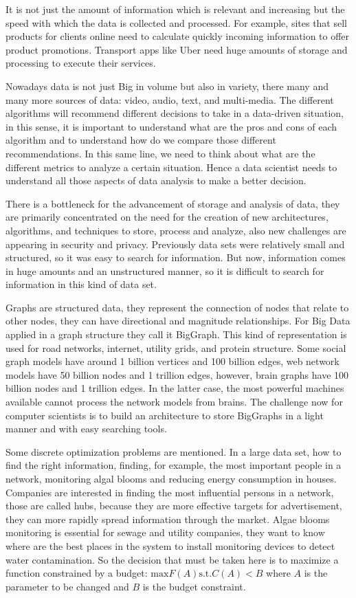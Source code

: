\documentclass[9pt,a4paper]{article}
\begin{document}
It is not just the amount of information which is relevant and increasing but the speed with which the data is collected and processed. For example, sites that sell products for clients online need to calculate quickly incoming information to offer product promotions. Transport apps like Uber need huge amounts of storage and processing to execute their services. 

Nowadays data is not just Big in volume but also in variety, there many and many more sources of data: video, audio, text, and multi-media. The different algorithms will recommend different decisions to take in a data-driven situation, in this sense, it is important to understand what are the pros and cons of each algorithm and to understand how do we compare those different recommendations. In this same line, we need to think about what are the different metrics to analyze a certain situation. Hence a data scientist needs to understand all those aspects of data analysis to make a better decision.

There is a bottleneck for the advancement of storage and analysis of data, they are primarily concentrated on the need for the creation of new architectures, algorithms, and techniques to store, process and analyze, also new challenges are appearing in security and privacy. Previously data sets were relatively small and structured, so it was easy to search for information. But now, information comes in huge amounts and an unstructured manner, so it is difficult to search for information in this kind of data set.

Graphs are structured data, they represent the connection of nodes that relate to other nodes, they can have directional and magnitude relationships. 
For Big Data applied in a graph structure they call it BigGraph. This kind of representation is used for road networks, internet, utility grids, and protein structure. Some social graph models have around 1 billion vertices and 100 billion edges, web network models have 50 billion nodes and 1 trillion edges, however, brain graphs have 100 billion nodes and 1 trillion edges. In the latter case, the most powerful machines available cannot process the network models from brains. The challenge now for computer scientists is to build an architecture to store BigGraphs in a light manner and with easy searching tools.

Some discrete optimization problems are mentioned. In a large data set, how to find the right information, finding, for example, the most important people in a network, monitoring algal blooms and reducing energy consumption in houses. Companies are interested in finding the most influential persons in a network, those are called hubs, because they are more effective targets for advertisement, they can more rapidly spread information through the market. Algae blooms monitoring is essential for sewage and utility companies, they want to know where are the best places in the system to install monitoring devices to detect water contamination. So the decision that must be taken here is to maximize a function constrained by a budget: $ \text{max} F(A)  \text{s.t.} C(A) < B $ where $A$ is the parameter to be changed and $B$ is the budget constraint.
\end{document}
